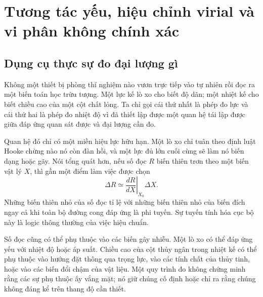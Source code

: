 \chapter{Tương tác yếu, hiệu chỉnh virial và vi phân không chính xác}


\section{Dụng cụ thực sự đo đại lượng gì}

Không một thiết bị phòng thí nghiệm nào vươn trực tiếp vào tự nhiên rồi đọc ra một biến toán học trừu tượng. Một lực kế lò xo cho biết độ dãn; một nhiệt kế cho biết chiều cao của một cột chất lỏng. Ta chỉ gọi cái thứ nhất là phép đo lực và cái thứ hai là phép đo nhiệt độ vì đã thiết lập được một quan hệ tái lập được giữa đáp ứng quan sát được và đại lượng cần đo.

Quan hệ đó chỉ có một miền hiệu lực hữu hạn. Một lò xo chỉ tuân theo định luật Hooke chừng nào nó còn đàn hồi, và một lực đủ lớn cuối cùng sẽ làm nó biến dạng hoặc gãy. Nói tổng quát hơn, nếu số đọc \(R\) biến thiên trơn theo một biến vật lý \(X\), thì gần một điểm làm việc được chọn \begin{equation}
 \Delta R \simeq
 \left.\frac{dR}{dX}\right|_{X_0}\Delta X.
 \label{eq:sm6-local-linear-response}
\end{equation} Những biến thiên nhỏ của số đọc tỉ lệ với những biến thiên nhỏ của biến đích ngay cả khi toàn bộ đường cong đáp ứng là phi tuyến. Sự tuyến tính hóa cục bộ này là logic thông thường của việc hiệu chuẩn.

Số đọc cũng có thể phụ thuộc vào các biến gây nhiễu. Một lò xo có thể đáp ứng yếu với nhiệt độ hoặc áp suất. Chiều cao của cột thủy ngân trong nhiệt kế có thể phụ thuộc vào hướng đặt thông qua trọng lực, vào các tính chất của thủy tinh, hoặc vào các biến đổi chậm của vật liệu. Một quy trình đo không chứng minh rằng các sự phụ thuộc ấy vắng mặt; nó giữ chúng cố định hoặc chỉ ra rằng chúng không đáng kể trên thang độ cần thiết.

